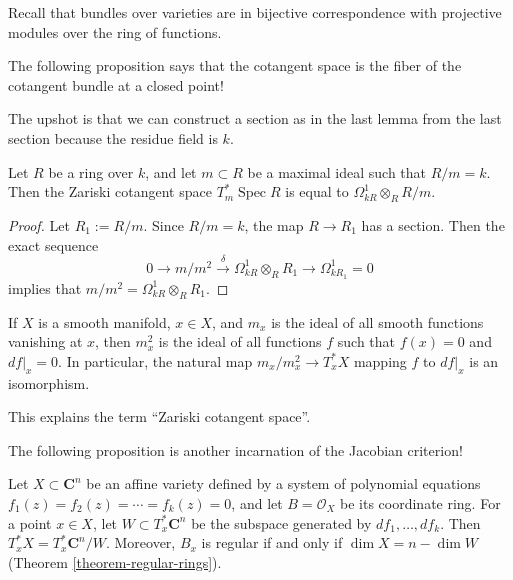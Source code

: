 \noindent
Recall that bundles over varieties
are in bijective correspondence with
projective modules over the ring of
functions.

The following proposition says that
the cotangent space is the fiber of
the cotangent bundle at a closed point!

The upshot is that we can construct
a section as in the last lemma
from the last section because the
residue field is $k$.

\begin{proposition}
\label{proposition-zariski-cotangent-space-kahler}
Let $R$ be a ring over $k$, and let
$m \subset R$ be a maximal ideal such that
$R/m = k$. Then the Zariski cotangent space
$T_m^\ast \operatorname{Spec} R$ is equal to
$\Omega^1_{kR}\otimes_R R/m$.
\end{proposition}

\begin{proof}
Let $R_1 := R/m$. Since $R/m = k$, the map
$R \to R_1$ has a section. Then the exact
sequence
$$
0 \to m/m^2 \xrightarrow{\delta}
\Omega^1_{kR}\otimes_R R_1
\to \Omega^1_{kR_1} = 0
$$
implies that
$m/m^2 = \Omega^1_{kR}\otimes_R R_1$.
\end{proof}

\begin{corollary}
\label{lemma-zariski-cotangent-space-manifold}
If $X$ is a smooth manifold, $x \in X$, and
$m_x$ is the ideal of all smooth functions
vanishing at $x$, then $m_x^2$ is the ideal
of all functions $f$ such that
$f(x)=0$ and $df|_x=0$. In particular, the
natural map
$m_x/m_x^2 \to T_x^\ast X$ mapping
$f$ to $df|_x$ is an isomorphism.
\end{corollary}

This explains the term ``Zariski cotangent
space''.

\medskip\noindent
The following proposition is another
incarnation of the Jacobian criterion!

\begin{proposition}
\label{proposition-regular-points-affine-variety}
Let $X \subset \mathbf{C}^n$ be an affine
variety defined by a system of polynomial
equations
$f_1(z)=f_2(z)=\cdots=f_k(z)=0$, and let
$B=\mathcal O_X$ be its coordinate ring.
For a point $x \in X$, let
$W \subset T_x^\ast \mathbf{C}^n$
be the subspace generated by
$df_1,\dots,df_k$.
Then
$T_x^\ast X = T_x^\ast \mathbf{C}^n/W$.
Moreover, $B_x$ is regular if and only if
$\dim X = n-\dim W$
(Theorem \ref{theorem-regular-rings}).
\end{proposition}

